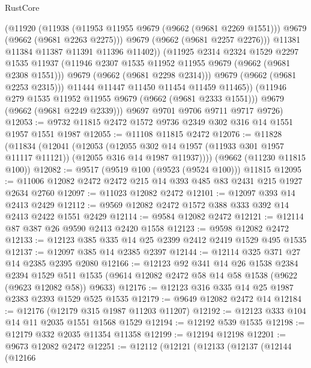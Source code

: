 \begin{lexlean}{RustCore}
\begin{coremodule}
                  (@11920
                    (@11938
                      (@11953 @11955 @9679 (@9662 (@9681 @2269 @1551)))
                      @9679
                      (@9662 (@9681 @2263 @2275)))
                    @9679
                    (@9662 (@9681 @2257 @2276)))
                  @11381
                  @11384
                  @11387
                  @11391
                  @11396
                  @11402))
              (@11925
                @2314
                @2324
                @1529
                @2297
                @1535
                @11937
                (@11946 @2307 @1535 @11952 @11955 @9679 (@9662 (@9681 @2308 @1551)))
                @9679
                (@9662 (@9681 @2298 @2314)))
              @9679
              (@9662 (@9681 @2253 @2315)))
            @11444
            @11447
            @11450
            @11454
            @11459
            @11465))
        (@11946 @279 @1535 @11952 @11955 @9679 (@9662 (@9681 @2333 @1551)))
        @9679
        (@9662 (@9681 @2249 @2339)))
      @9697
      @9701
      @9706
      @9711
      @9717
      @9726)
@12053 := @9732 @11815 @2472 @1572 @9736 @2349 @302 @316 @14 @1551 @1957 @1551 @1987
@12055 := @11108 @11815 @2472
@12076 := @11828
    (@11834
      (@12041
        (@12053
          (@12055 @302 @14 @1957 (@11933 @301 @1957 @11117 @11121))
          (@12055 @316 @14 @1987 @11937))))
    (@9662 (@11230 @11815 @100))
@12082 := @9517 (@9519 @100 (@9523 (@9524 @100))) @11815
@12095 := @11006 @12082 @2472 @2472 @215 @14 @393 @485 @83 @2431 @215 @1927 @2634 @2760
@12097 := @11023 @12082 @2472
@12101 := @12097 @393 @14 @2413 @2429
@12112 := @9569 @12082 @2472 @1572 @388 @333 @392 @14 @2413 @2422 @1551 @2429
@12114 := @9584 @12082 @2472
@12121 := @12114 @87 @387 @26 @9590 @2413 @2420 @1558
@12123 := @9598 @12082 @2472
@12133 := @12123 @385 @335 @14 @25 @2399 @2412 @2419 @1529 @495 @1535
@12137 := @12097 @385 @14 @2385 @2397
@12144 := @12114 @325 @371 @27 @14 @2385 @2395 @2080
@12166 := @12123
    @92
    @341
    @14
    @26
    @1538
    @2384
    @2394
    @1529
    @511
    @1535
    (@9614 @12082 @2472 @58 @14 @58 @1538 (@9622 (@9623 @12082 @58)) @9633)
@12176 := @12123 @316 @335 @14 @25 @1987 @2383 @2393 @1529 @525 @1535
@12179 := @9649 @12082 @2472 @14
@12184 := @12176 (@12179 @315 @1987 @11203 @11207)
@12192 := @12123 @333 @104 @14 @11 @2035 @1551 @1568 @1529
@12194 := @12192 @539 @1535
@12198 := @12179 @332 @2035 @11354 @11358
@12199 := @12194 @12198
@12201 := @9673 @12082 @2472
@12251 := @12112
    (@12121
      (@12133
        (@12137
          (@12144
            (@12166

\end{coremodule}
\end{lexlean}
